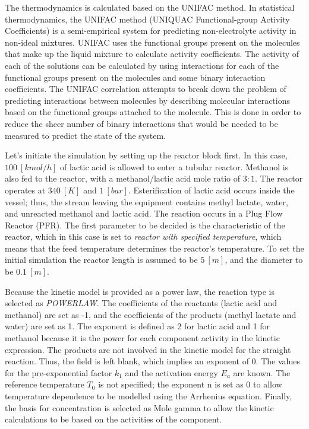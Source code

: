 The thermodynamics is calculated based on the UNIFAC method. In statistical thermodynamics, the UNIFAC method (UNIQUAC Functional-group Activity Coefficients) is a semi-empirical system for predicting non-electrolyte activity in non-ideal mixtures. UNIFAC uses the functional groups present on the molecules that make up the liquid mixture to calculate activity coefficients. The activity of each of the solutions can be calculated by using interactions for each of the functional groups present on the molecules and some binary interaction coefficients. The UNIFAC correlation attempts to break down the problem of predicting interactions between molecules by describing molecular interactions based on the functional groups attached to the molecule. This is done in order to reduce the sheer number of binary interactions that would be needed to be measured to predict the state of the system.

Let's initiate the simulation by setting up the reactor block first. In this case, $100~[kmol/h]$ of lactic acid is allowed to enter a tubular reactor. Methanol is also fed to the reactor, with a methanol/lactic acid mole ratio of $3:1$. The reactor operates at $340~[K]$ and $1~[bar]$. Esterification of lactic acid occurs inside the vessel; thus, the stream leaving the equipment contains methyl lactate, water, and unreacted methanol and lactic acid. The reaction occurs in a Plug Flow Reactor (PFR). The first parameter to be decided is the characteristic of the reactor, which in this case is set to \textit{reactor with specified temperature}, which means that the feed temperature determines the reactor's temperature. To set the initial simulation the reactor length is assumed to be $5~[m]$, and the diameter to be $0.1~[m]$. 

Because the kinetic model is provided as a power law, the reaction type is selected as \textit{POWERLAW}. The coefficients of the reactants (lactic acid and methanol) are set as -1, and the coefficients of the products (methyl lactate and water) are set as 1. The exponent is defined as 2 for lactic acid and 1 for methanol because it is the power for each component activity in the kinetic expression. The products are not involved in the kinetic model for the straight reaction. Thus, the field is left blank, which implies an exponent of 0. The values for the pre-exponential factor $k_1$ and the activation energy $E_a$ are known. The reference temperature $T_0$ is not specified; the exponent n is set as 0 to allow temperature dependence to be modelled using the Arrhenius equation. Finally, the basis for concentration is selected as Mole gamma to allow the kinetic calculations to be based on the activities of the component.

